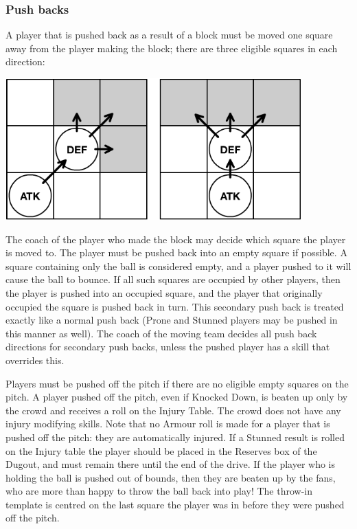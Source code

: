 \documentclass{article}
\begin{document}
\begin{multicols}{2}
\subsubsection{Push backs}
\par A player that is pushed back as a result of a block must be moved one square away from the player making the block; there are three eligible squares in each direction:
\medskip
\begin{center}
\includegraphics[width=0.6\columnwidth]{pushbacks}
\end{center}
\par The coach of the player who made the block may decide which square the player is moved to. The player must be pushed back into an empty square if possible. A square containing only the ball is considered empty, and a player pushed to it will cause the ball to bounce. If all such squares are occupied by other players, then the player is pushed into an occupied square, and the player that originally occupied the square is pushed back in turn. This secondary push back is treated exactly like a normal push back (Prone and Stunned players may be pushed in this manner as well). The coach of the moving team decides all push back directions for secondary push backs, unless the pushed player has a skill that overrides this.
\par Players must be pushed off the pitch if there are no eligible empty squares on the pitch. A player pushed off the pitch, even if Knocked Down, is beaten up only by the crowd and receives a roll on the Injury Table. The crowd does not have any injury modifying skills. Note that no Armour roll is made for a player that is pushed off the pitch: they are automatically injured. If a Stunned result is rolled on the Injury table the player should be placed in the Reserves box of the Dugout, and must remain there until the end of the drive. If the player who is holding the ball is pushed out of bounds, then they are beaten up by the fans, who are more than happy to throw the ball back into play! The throw-in template is centred on the last square the player was in before they were pushed off the pitch.


\end{multicols}
\end{document}
